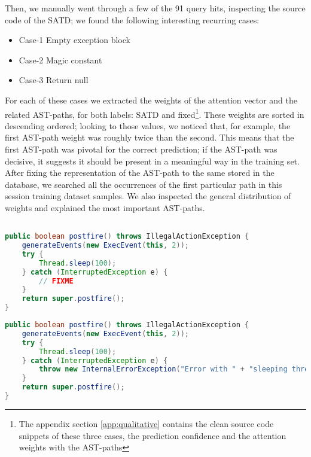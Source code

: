 Then, we manually went through a few of the 91 query hits, inspecting the source code of the SATD; we found the following interesting recurring cases:
\begin{itemize}
    \item Case-1 Empty exception block %
    \item Case-2 Magic constant %
    \item Case-3 Return null %
\end{itemize}

For each of these cases we extracted the weights of the attention vector and the related AST-paths, for both labels: SATD and fixed\footnote{The appendix section \ref{app:qualitative} contains the clean source code snippets of these three cases, the prediction confidence and the attention weights with the AST-paths}. These weights are sorted in descending ordered; looking to those values, we noticed that, for example, the first AST-path weight was roughly twice than the second. This means that the first AST-path was pivotal for the correct prediction; if the AST-path was decisive, it suggests it should be present in a meaningful way in the training set. After fixing the representation of the AST-path to the same stored in the database, we searched all the occurrences of the first particular path in this session training dataset samples. We also inspected the general distribution of weights and explained the most important AST-paths.


\begin{lstlisting}[caption={Case-1 SATD, verbatim source code}, label={lst:case_empty_exception},language=Java]

public boolean postfire() throws IllegalActionException {
    generateEvents(new ExecEvent(this, 2));
    try {
        Thread.sleep(100);
    } catch (InterruptedException e) {
        // FIXME
    }
    return super.postfire();
}

\end{lstlisting}

\begin{lstlisting}[caption={Case-1 fixed, verbatim source code}, label={lst:case1fixed},language=Java]
public boolean postfire() throws IllegalActionException {
    generateEvents(new ExecEvent(this, 2));
    try {
        Thread.sleep(100);
    } catch (InterruptedException e) {
        throw new InternalErrorException("Error with " + "sleeping thread in postfire");
    }
    return super.postfire();
}
\end{lstlisting}


